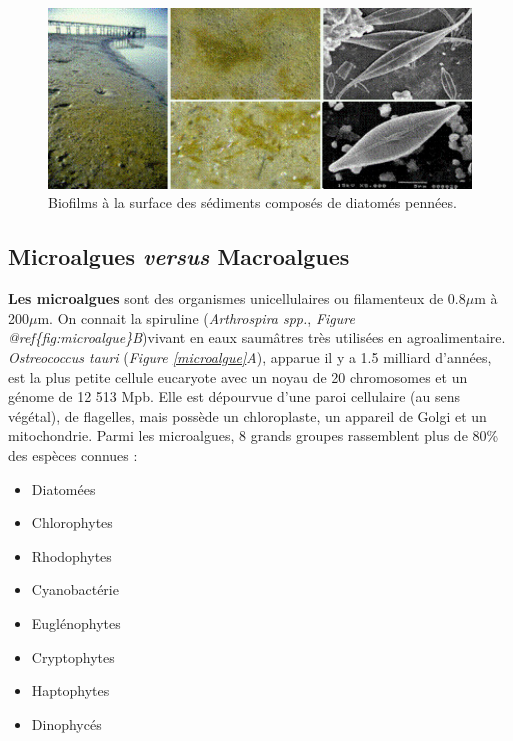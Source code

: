\documentclass[
]{book}
\providecommand{\tightlist}{%
  \setlength{\itemsep}{0pt}\setlength{\parskip}{0pt}}
\begin{document}
\begin{figure}

{\centering \includegraphics[width=5.67in]{images/biofilm} 

}

\caption{Biofilms à la surface des sédiments composés de diatomés pennées.}\label{fig:biofilm}
\end{figure}

\hypertarget{microalgues-versus-macroalgues}{%
\subsection{\texorpdfstring{Microalgues \emph{versus} Macroalgues}{Microalgues versus Macroalgues}}\label{microalgues-versus-macroalgues}}

\textbf{Les microalgues} sont des organismes unicellulaires ou filamenteux de 0.8\(\mu\)m à 200\(\mu\)m. On connait la spiruline (\emph{Arthrospira spp.}, \emph{Figure @ref\{fig:microalgue\}B})vivant en eaux saumâtres très utilisées en agroalimentaire. \emph{Ostreococcus tauri} (\emph{Figure \ref{microalgue}A}), apparue il y a 1.5 milliard d'années, est la plus petite cellule eucaryote avec un noyau de 20 chromosomes et un génome de 12 513 Mpb. Elle est dépourvue d'une paroi cellulaire (au sens végétal), de flagelles, mais possède un chloroplaste, un appareil de Golgi et un mitochondrie. Parmi les microalgues, 8 grands groupes rassemblent plus de 80\% des espèces connues :

\begin{itemize}
\tightlist
\item
  Diatomées
\item
  Chlorophytes
\item
  Rhodophytes
\item
  Cyanobactérie
\item
  Euglénophytes
\item
  Cryptophytes
\item
  Haptophytes
\item
  Dinophycés
\end{itemize}
\end{document}
